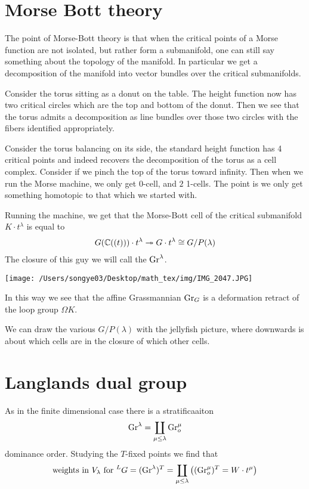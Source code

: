 \documentclass[12pt]{article}
\begin{document}
\section{Morse Bott theory}
The point of Morse-Bott theory is that when the critical points of a Morse function are not isolated,
but rather form a submanifold, one can still say something about the topology of the manifold.
In particular we get a decomposition of the manifold into vector bundles over the critical submanifolds.

\begin{example}
    Consider the torus sitting as a donut on the table. The height function now has two critical circles
    which are the top and bottom of the donut. Then we see that the torus admits a decomposition as line bundles 
    over those two circles with the fibers identified appropriately.
\end{example}

\begin{example}
    Consider the torus balancing on its side, the standard height function has 4 critical points and indeed 
    recovers the decomposition of the torus as a cell complex. Consider if we 
    pinch the top of the torus toward infinity. Then when we run the Morse machine, we only get $0$-cell,
    and $2$ 1-cells. The point is we only get something homotopic to that which we started with.
\end{example}
Running the machine, we get that the Morse-Bott cell of the critical submanifold $K \cdot t^\lambda$ is equal to \begin{align*}
    G(\mathbb{C}((t)))\cdot t^\lambda \twoheadrightarrow G\cdot t^\lambda \cong G/P(\lambda)
\end{align*} The closure of this guy we will call the  $\operatorname{Gr}^\lambda$.
\begin{center}
    \texttt{[image: /Users/songye03/Desktop/math\_tex/img/IMG\_2047.JPG]}
\end{center}
In this way we see that the affine Grassmannian $\operatorname{Gr}_G$ is a deformation retract of the loop group $\Omega K$.

\hfill

We can draw the various $G/P(\lambda)$ with the jellyfish picture, where downwards is about which 
cells are in the closure of which other cells.

\section{Langlands dual group}
As in the finite dimensional case there is a stratificaaiton \begin{align*}
    \operatorname{Gr}^\lambda = \coprod_{\mu \leq \lambda} \operatorname{Gr}^\mu_o
\end{align*} dominance order. Studying the $T$-fixed points we find that \begin{align*}
    \text{weights in $V_\lambda$ for $\prescript{L}{}{G}$}= (\operatorname{Gr}^\lambda)^T = \coprod_{\mu \leq \lambda} \big((\operatorname{Gr}^\mu_o)^T = W\cdot t^\mu\big)
\end{align*}
\end{document}
